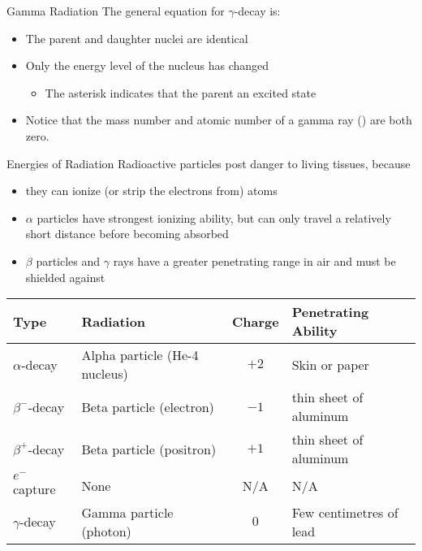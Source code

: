 \documentclass[12pt,compress,aspectratio=169]{beamer}
\newcommand{\eq}[2]{
  \vspace{#1}{\Large\begin{displaymath}#2\end{displaymath}}
}
\begin{document}
\begin{frame}{Gamma Radiation}
  The general equation for $\gamma$-decay is:

  \eq{-.15in}{
    \boxed{\ce{^A_ZX^* -> ^A_ZX + ^0_0$\gamma$}}
  }
  \begin{itemize}
  \item The parent and daughter nuclei are identical
  \item Only the energy level of the nucleus has changed
    \begin{itemize}
    \item The asterisk indicates that the parent an excited state
    \end{itemize}
  \item Notice that the mass number and atomic number of a gamma ray
    () are both zero.
  \end{itemize}
\end{frame}



\begin{frame}{Energies of Radiation}
  Radioactive particles post danger to living tissues, because
  \begin{itemize}
  \item they can ionize (or strip the electrons from) atoms
  \item $\alpha$ particles have strongest ionizing ability, but can only travel
    a relatively short distance before becoming absorbed
  \item $\beta$ particles and $\gamma$ rays have a greater penetrating range in
    air and must be shielded against
  \end{itemize}
  \begin{tabular}{l|l|c|l}
    \rowcolor{pink}
    \textbf{Type} & \textbf{Radiation} & \textbf{Charge} &
    \textbf{Penetrating Ability}\\ \hline
    $\alpha$-decay   & Alpha particle (He-4 nucleus) & $+2$ & Skin or paper\\
    $\beta^-$-decay  & Beta particle (electron)          & $-1$ &
    thin sheet of aluminum\\
    $\beta^+$-decay  & Beta particle (positron)          & $+1$ &
    thin sheet of aluminum\\
    $e^-$ capture & None                              & N/A  & N/A \\
    $\gamma$-decay   & Gamma particle (photon)           & $0$  &
    Few centimetres of lead
  \end{tabular}
\end{frame}
\end{document}
